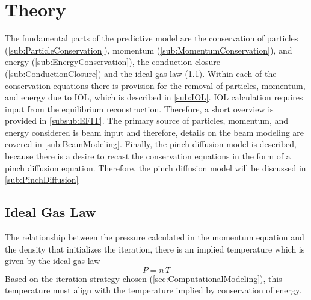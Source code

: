 \section{Theory} \label{sec:Theory}

The fundamental parts of the predictive model are the conservation of particles (\cref{sub:ParticleConservation}), momentum (\cref{sub:MomentumConservation}), and energy (\cref{sub:EnergyConservation}), the conduction closure (\cref{sub:ConductionClosure}) and the ideal gas law (\cref{sub:IdealGasLaw}). Within each of the conservation equations there is provision for the removal of particles, momentum, and energy due to \ac{IOL}, which is described in \cref{sub:IOL}. \ac{IOL} calculation requires input from the equilibrium reconstruction. Therefore, a short overview is provided in \cref{subsub:EFIT}.  The primary source of particles, momentum, and energy considered is beam input and therefore, details on the beam modeling are covered in \cref{sub:BeamModeling}. Finally, the pinch diffusion model is described, because there is a desire to recast the conservation equations in the form of a pinch diffusion equation. Therefore, the pinch diffusion model will be discussed in \cref{sub:PinchDiffusion}

















\subsection{Ideal Gas Law}\label{sub:IdealGasLaw}

The relationship between the pressure calculated in the momentum equation and the density that initializes the iteration, there is an implied temperature which is given by the ideal gas law
\begin{equation}
	P = n\, T
	\label{eqn:IdealGasLaw}
\end{equation}
Based on the iteration strategy chosen (\cref{sec:ComputationalModeling}), this temperature must align with the temperature implied by conservation of energy.





